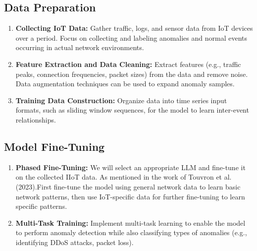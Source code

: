 \documentclass[12pt]{article}
\begin{document}
\subsection{Data Preparation}
\begin{enumerate}[label=\arabic*.]
  \item \textbf{Collecting IoT Data:} Gather traffic, logs, and sensor data from IoT devices over a period. Focus on collecting and labeling anomalies and normal events occurring in actual network environments.
  
  \item \textbf{Feature Extraction and Data Cleaning:} Extract features (e.g., traffic peaks, connection frequencies, packet sizes) from the data and remove noise. Data augmentation techniques can be used to expand anomaly samples.
  
  \item \textbf{Training Data Construction:} Organize data into time series input formats, such as sliding window sequences, for the model to learn inter-event relationships.
\end{enumerate}

\subsection{Model Fine-Tuning}
\begin{enumerate}[label=\arabic*.]
  \item \textbf{Phased Fine-Tuning:} We will select an appropriate LLM and fine-tune it on the collected IIoT data. As mentioned in the work of Touvron et al. (2023)\citep{sarabi2023llm}.First fine-tune the model using general network data to learn basic network patterns, then use IoT-specific data for further fine-tuning to learn specific patterns.
  
  \item \textbf{Multi-Task Training:} Implement multi-task learning to enable the model to perform anomaly detection while also classifying types of anomalies (e.g., identifying DDoS attacks, packet loss).
\end{enumerate}
\end{document}

